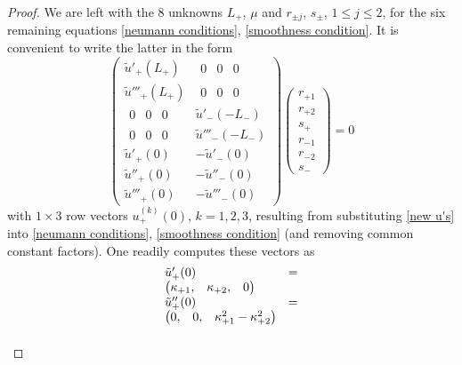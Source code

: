 \documentclass[10pt,a4paper]{amsart}
\begin{document}
\begin{proof}
		 We are left with the 8 unknowns $L_+$, $\mu$ and $r_{\pm j}$, $s_{\pm}$, $1 \leq j \leq 2$, for the six remaining equations  \eqref{neumann conditions}, \eqref{smoothness condition}. It is convenient to write the latter in the form  
		\begin{equation}\label{system}
			\begin{pmatrix}
				\tilde{u}'_+(L_+) & \begin{matrix} 0 & 0 & 0\end{matrix} \\
				\tilde{u}'''_+(L_+) & \begin{matrix} 0 & 0 & 0\end{matrix} \\
				\begin{matrix} 0 & 0 & 0\end{matrix} & \tilde{u}'_-(-L_-) \\
				\begin{matrix} 0 & 0 & 0\end{matrix} & \tilde{u}'''_-(-L_-) \\
				\tilde{u}'_+(0) & -\tilde{u}'_-(0) \\
				\tilde{u}''_+(0) & -\tilde{u}''_-(0) \\
				\tilde{u}'''_+(0) & -\tilde{u}'''_-(0) 
			\end{pmatrix}
			\begin{pmatrix}
				r_{+1} \\ 
				r_{+2} \\
				s_+ \\
				r_{-1} \\
				r_{-2} \\
				s_-
			\end{pmatrix} = 0
		\end{equation} 
		with $1\times 3$ row vectors $u_+^{(k)}(0)$, $k=1,2,3$, resulting from substituting \eqref{new u's} into \eqref{neumann conditions}, \eqref{smoothness condition} (and removing common constant factors). One readily computes these vectors as 
		\begin{equation}
			\begin{tabular}{p{0.31\linewidth} p{0.5\linewidth}}
				\parbox{\linewidth}{$\tilde{u}'_+(0) = \begin{pmatrix}
						\kappa_{+1}, & \kappa_{+2}, & 0
					\end{pmatrix}$ \\
					$\tilde{u}''_+(0) = \begin{pmatrix}
						0, & 0, & \kappa_{+1}^2 - \kappa_{+2}^2  
					\end{pmatrix}$ \\
}
\end{tabular}
\end{equation}
\end{proof}
\end{document}
